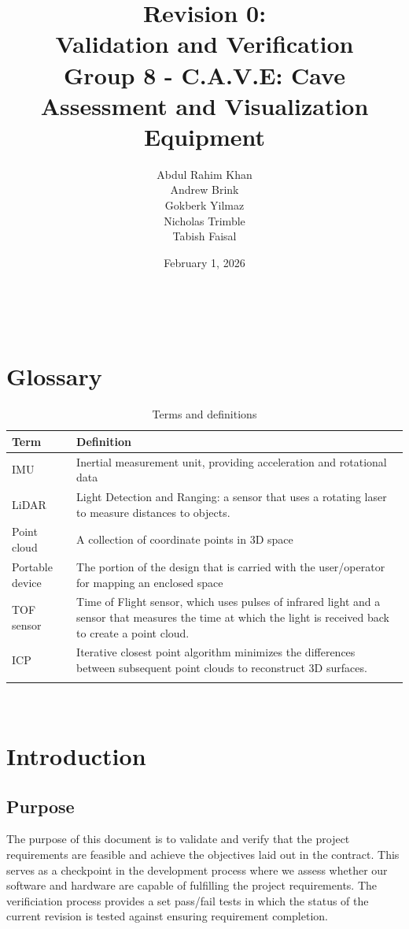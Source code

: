 \documentclass[11pt]{article}
\title{\textbf{Revision 0: \\Validation and Verification \\ \large Group 8 - C.A.V.E: Cave Assessment and Visualization Equipment}}
\author{Abdul Rahim Khan \\ Andrew Brink \\ Gokberk Yilmaz \\ Nicholas Trimble \\ Tabish Faisal}
\date{February 1, 2026}
\begin{document}
	
	\maketitle
	~\newpage
	\tableofcontents
	~\newpage
	\section*{Glossary}
	
	\begin{table}[h]
		\centering
		\begin{tabularx}{\textwidth}{X p{}}
			\toprule
			\textbf{Term} & \textbf{Definition} \\
			\midrule
			IMU & Inertial measurement unit, providing acceleration and rotational data \\
			\addlinespace
			LiDAR & Light Detection and Ranging: a sensor that uses a rotating laser to measure distances to objects. \\
			\addlinespace
			Point cloud & A collection of coordinate points in 3D space \\
			\addlinespace
			Portable device & The portion of the design that is carried with the user/operator for mapping an enclosed space \\
			\addlinespace
			TOF sensor & Time of Flight sensor, which uses pulses of infrared light and a sensor that measures the time at which the light is received back to create a point cloud. \\
			\addlinespace
			ICP & Iterative closest point algorithm minimizes the differences between subsequent point clouds to reconstruct 3D surfaces. \\
			\bottomrule
			\caption{Terms and definitions}
		\end{tabularx}
	\end{table}
	~\newpage
	
	\section{Introduction}
	\subsection{Purpose}
	
	The purpose of this document is to validate and verify that the project requirements are feasible and achieve the objectives laid out in the contract. This serves as a checkpoint in the development process where we assess whether our software and hardware are capable of fulfilling the project requirements. The verificiation process provides a set pass/fail tests in which the status of the current revision is tested against ensuring requirement completion.
	
\end{document}
